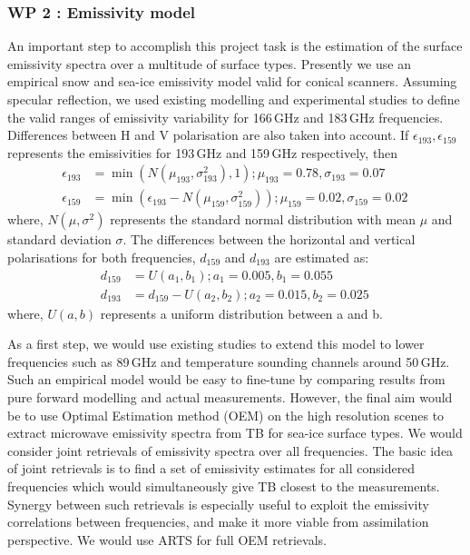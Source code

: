 \documentclass[12pt,oneside,a4paper]{article}
\begin{document}
\subsubsection*{WP 2 : Emissivity model}
%
\label{sec:emissivity}
An important step to accomplish this project task is the estimation of the surface emissivity spectra over a multitude of surface types. Presently we use an empirical snow and sea-ice emissivity model valid for conical scanners. Assuming specular reflection, we used existing modelling and experimental studies\citep{harlow:2009:milli, harlow:2012:tundr,hewison:2002:airbo} to define the valid ranges of emissivity variability for 166\,GHz and 183\,GHz frequencies.  Differences between H and V polarisation are also taken into account. If $\epsilon_{193}, \epsilon_{159}$ represents the emissivities for 193\,GHz and 159\,GHz respectively, then
\begin{align}
\epsilon_{193}& = \min({N(\mu_{193}, \sigma_{193}^{2}), 1}) ; \mu_{193} = 0.78, \sigma_{193} = 0.07 \\
\epsilon_{159}& = \min(\epsilon_{193} - N(\mu_{159}, \sigma_{159}^{2})) ;  \mu_{159} = 0.02, \sigma_{159} = 0.02\,
\end{align}
where, $N(\mu, \sigma^{2})$ represents the standard normal distribution with mean $\mu$ and standard deviation $\sigma$. The differences between the horizontal and vertical polarisations for both frequencies, $d_{159}$ and $d_{193}$ are estimated as:
\begin{align}
d_{159}& = U(a_1, b_1) ; a_1 = 0.005, b_1 = 0.055\\
d_{193}& = d_{159} - U(a_2, b_2) ; a_2 = 0.015, b_2 = 0.025 \,
\end{align}
where, $U(a, b)$ represents a uniform distribution between a and b. 


As a first step, we would use existing studies to extend this model to lower frequencies such as 89\,GHz and temperature sounding channels around 50\,GHz. Such an empirical model would be easy to fine-tune by comparing results from pure forward modelling and actual measurements. However, the final aim would be to use Optimal Estimation method (OEM) on the high resolution scenes to extract microwave emissivity spectra from TB for sea-ice surface types. We would consider joint retrievals of emissivity spectra over all frequencies. The basic idea of joint retrievals is to find a set of emissivity estimates for all considered frequencies which would simultaneously give TB closest to the measurements. Synergy between such retrievals is especially useful to exploit the emissivity correlations between frequencies, and make it more viable from assimilation perspective. We would use ARTS for full OEM retrievals.
\end{document}
